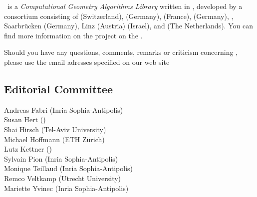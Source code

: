 
\cgal\ is a {\em Computational Geometry Algorithms Library} written in \CC, 
developed by a consortium consisting of
 (Switzerland), 
 (Germany), 
 (France),
 (Germany),
,
Saarbr\"ucken (Germany),
 Linz (Austria)
 (Israel), and
 (The Netherlands). 
You can find more information on the project on the 
.

Should you have any questions, comments, remarks or criticism concerning 
\cgal, please use the email adresses specified on our web site


\subsection*{Editorial Committee}

Andreas Fabri ({\sc Inria} Sophia-Antipolis) \\
Susan Hert ()\\
Shai Hirsch (Tel-Aviv University) \\
Michael Hoffmann (ETH Z\"urich) \\
Lutz Kettner ()\\
Sylvain Pion ({\sc Inria} Sophia-Antipolis)\\
Monique Teillaud ({\sc Inria} Sophia-Antipolis)\\
Remco Veltkamp (Utrecht University)\\
Mariette Yvinec ({\sc Inria} Sophia-Antipolis)\\

